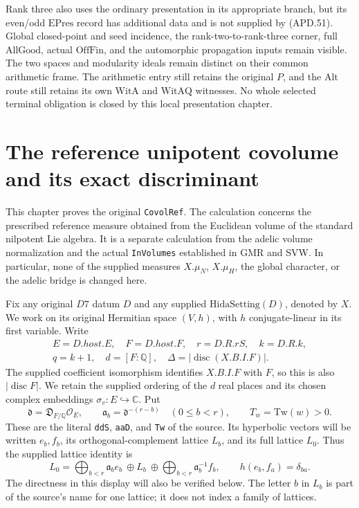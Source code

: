 \documentclass[11pt,a4paper]{article}
\numberwithin{equation}{section}
\theoremstyle{remark}\newtheorem{remark}[theorem]{Remark}
\begin{document}
Rank three also uses the ordinary presentation in its appropriate
branch, but its even/odd \(\mathrm{EPres}\) record has additional
data and is not supplied by (APD.51).  Global closed-point and
seed incidence, the rank-two-to-rank-three corner, full
\(\mathrm{AllGood}\), actual \(\mathrm{OffFin}\), and the
automorphic propagation inputs remain visible.  The two spaces
and modularity ideals remain distinct on their common arithmetic
frame.  The arithmetic entry still retains the original \(P\),
and the Alt route still retains its own \(\mathrm{WitA}\) and
\(\mathrm{WitAQ}\) witnesses.  No whole selected terminal
obligation is closed by this local presentation chapter.


\section{The reference unipotent covolume and its exact discriminant}
\label{sec:reference-covolume-v56}

This chapter proves the original \texttt{Covol\allowbreak Ref}.  The calculation concerns
the prescribed reference measure obtained from the Euclidean volume of the
standard nilpotent Lie algebra.  It is a separate calculation from the
adelic volume normalization and the actual \texttt{In\allowbreak Volumes} established
in GMR and SVW.  In particular, none of the supplied measures
\(X.\mu_N\), \(X.\mu_H\), the global character, or the adelic bridge is
changed here.

Fix any original \(D7\) datum \(D\) and any supplied
\(\mathrm{HidaSetting}(D)\), denoted by \(X\).  We work on its original
Hermitian space \((V,h)\), with \(h\) conjugate-linear in its first
variable.  Write
\[
 \begin{gathered}
 E=D.host.E,\quad F=D.host.F,\quad r=D.R.rS,\quad k=D.R.k,\\
 q=k+1,\quad d=[F:\mathbb Q],\quad
 \Delta=|\operatorname{disc}(X.B.I.F)|.
 \end{gathered}
\]
The supplied coefficient isomorphism identifies \(X.B.I.F\) with \(F\),
so this is also \(|\operatorname{disc}F|\).  We retain the supplied
ordering of the \(d\) real places and its chosen complex embeddings
\(\sigma_v:E\hookrightarrow\mathbb C\).  Put
\[
 \mathfrak d=\mathfrak D_{F/\mathbb Q}\mathcal O_E,
 \qquad \mathfrak a_b=\mathfrak d^{-(r-b)}\quad(0\leq b<r),
 \qquad T_w=\mathrm{Tw}(w)>0.
\tag{RCV.1}
\]
These are the literal \texttt{dd\allowbreak S}, \texttt{aa\allowbreak D}, and \texttt{Tw} of the
source.  Its hyperbolic vectors will be written \(e_b,f_b\), its
orthogonal-complement lattice \(L_b\), and its full lattice \(L_0\).
Thus the supplied lattice identity is
\[
 L_0=\bigoplus_{b<r}\mathfrak a_b e_b\ \oplus L_b\ \oplus
       \bigoplus_{b<r}\mathfrak a_b^{-1}f_b,
 \qquad h(e_b,f_a)=\delta_{ba}.
\tag{RCV.2}
\]
The directness in this display will also be verified below.  The letter
\(b\) in \(L_b\) is part of the source's name for one lattice; it does
not index a family of lattices.
\end{document}
